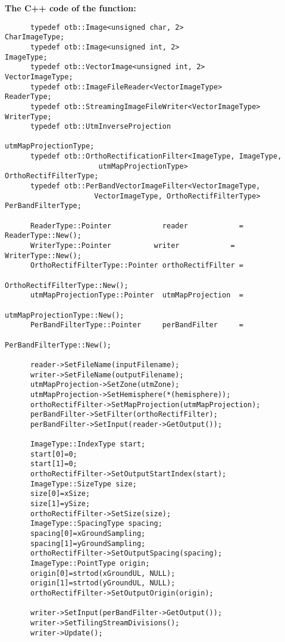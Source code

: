       \textbf{The C++ code of the function:}\\
\begin{verbatim}
      typedef otb::Image<unsigned char, 2>                    CharImageType;
      typedef otb::Image<unsigned int, 2>                     ImageType;
      typedef otb::VectorImage<unsigned int, 2>               VectorImageType;
      typedef otb::ImageFileReader<VectorImageType>           ReaderType;
      typedef otb::StreamingImageFileWriter<VectorImageType>  WriterType;
      typedef otb::UtmInverseProjection
                                                          utmMapProjectionType;
      typedef otb::OrthoRectificationFilter<ImageType, ImageType,
                      utmMapProjectionType>              OrthoRectifFilterType;
      typedef otb::PerBandVectorImageFilter<VectorImageType,
                     VectorImageType, OrthoRectifFilterType> PerBandFilterType;

      ReaderType::Pointer            reader            = ReaderType::New();
      WriterType::Pointer	       writer            = WriterType::New();
      OrthoRectifFilterType::Pointer orthoRectifFilter =
                                                OrthoRectifFilterType::New();
      utmMapProjectionType::Pointer  utmMapProjection  =
                                                 utmMapProjectionType::New();
      PerBandFilterType::Pointer     perBandFilter     =
                                                    PerBandFilterType::New();

      reader->SetFileName(inputFilename);
      writer->SetFileName(outputFilename);
      utmMapProjection->SetZone(utmZone);
      utmMapProjection->SetHemisphere(*(hemisphere));
      orthoRectifFilter->SetMapProjection(utmMapProjection);
      perBandFilter->SetFilter(orthoRectifFilter);
      perBandFilter->SetInput(reader->GetOutput());

      ImageType::IndexType start;
      start[0]=0;
      start[1]=0;
      orthoRectifFilter->SetOutputStartIndex(start);
      ImageType::SizeType size;
      size[0]=xSize;
      size[1]=ySize;
      orthoRectifFilter->SetSize(size);
      ImageType::SpacingType spacing;
      spacing[0]=xGroundSampling;
      spacing[1]=yGroundSampling;
      orthoRectifFilter->SetOutputSpacing(spacing);
      ImageType::PointType origin;
      origin[0]=strtod(xGroundUL, NULL);
      origin[1]=strtod(yGroundUL, NULL);
      orthoRectifFilter->SetOutputOrigin(origin);

      writer->SetInput(perBandFilter->GetOutput()); 	
      writer->SetTilingStreamDivisions();
      writer->Update();
\end{verbatim}

